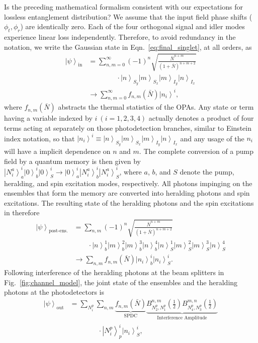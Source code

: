 \documentclass[aps,twocolumn,secnumarabic,amsmath,amssymb,pra,groupedaddress,
showpacs, showkeys,draft]{revtex4-1}
\newcommand{\ket}[1]{\left|#1\right\rangle}
\newcommand{\pna}[1]{\left(#1\right)}
\begin{document}
Is the preceding mathematical formalism consistent with our expectations for
lossless entanglement distribution? We assume that the input field phase shifts
($\phi_t,\phi_r$) are identically zero. Each of the four orthogonal signal and
idler modes experience linear loss independently. Therefore, to avoid
redundancy in the notation, we write the Gaussian state in
Eqn.~\ref{eq:final_singlet}, at all orders, as 
\begin{align}
\ket{\psi}_{\textrm{in}}&=\sum_{n,m=0}^{\infty}
\pna{-1}^n\sqrt{\frac{\bar{N}^{n+m}}{\pna{1+\bar{N}}^{n+m+2}}} \nonumber \\ 
& \qquad \qquad \cdot\ket{n}_{S_y}\ket{m}_{S_x}\ket{m}_{I_y}\ket{n}_{I_x}
\nonumber \\
 & \rightarrow \sum_{n,m=0}^{\infty} f_{n,m}\pna{\bar{N}}\ket{n_i}^i,
\end{align}
where $f_{n,m}\pna{\bar{N}}$ abstracts the thermal statistics of the OPAs. Any
state or term having a variable indexed by $i~\pna{i=1,2,3,4}$ actually denotes
a product of four terms acting at separately on those photodetection branches,
similar to Einstein index notation, so that $\ket{n_i}^i\equiv
\ket{n}_{S_y}\ket{m}_{S_x}\ket{m}_{I_y}\ket{n}_{I_x}$ and any usage of the
$n_i$ will have a implicit dependence on $n$ and $m$. The complete conversion
of a pump field by a quantum memory is then given by
$\ket{N^a_i}_a^i\ket{0}_b^i\ket{0}_S^i\rightarrow\ket{0}_a^i\ket{N^a_i}_b^i\ket{N^a_i}_S^i$,
where $a$, $b$, and $S$ denote the pump, heralding, and spin excitation modes,
respectively. All photons impinging on the ensembles that form the memory are
converted into heralding photons and spin excitations. The resulting state of
the heralding photons and the spin excitations in therefore
\begin{align}
\ket{\psi}_{\textrm{post-ens.}}& = \sum_{n,m}
\pna{-1}^n\sqrt{\frac{\bar{N}^{n+m}}{\pna{1+\bar{N}}^{n+m+2}}}  \nonumber \\
& \qquad \cdot\ket{n}^1_b \ket{m}^2_b \ket{m}^3_b \ket{n}^4_b 
\ket{n}^1_S \ket{m}^2_S \ket{m}^3_S \ket{n}^4_S  \nonumber  \\
& \rightarrow \sum_{n,m}f_{n,m}\pna{\bar{N}}\ket{n_i}^i_b\ket{n_i}^i_S.
\end{align}
Following interference of the heralding photons at the beam splitters in
Fig.~\ref{fig:channel_model}, the joint state of the ensembles and the
heralding photons at the photodetectors is
\begin{align}
\ket{\psi}_{\textrm{out}} &=\sum_{N_i^p}\sum_{n,m} \underbrace{f_{n,m}\pna{\bar{N}}}_\text{SPDC} \underbrace{B_{N_2^p,N_1^p}^{n,m}\pna{\frac{1}{2}}  
B_{N_4^p,N_3^p}^{m,n}\pna{\frac{1}{2}}}_\text{Interference Amplitude}\nonumber
\\ & \qquad \qquad \cdot\ket{N_i^p}^i_p\ket{n_i}^i_S, \label{eq:chap3:lossless_output}
\end{align}
\end{document}
